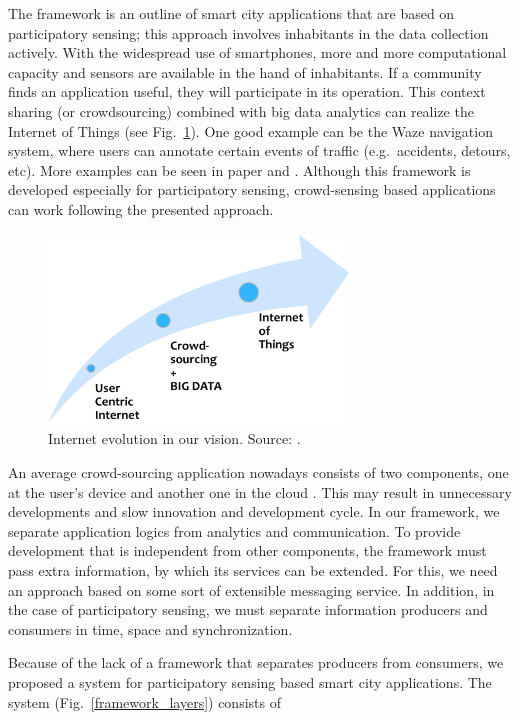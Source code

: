 \documentclass[b5paper,12pt]{report}
\theoremstyle{definition}
\begin{document}
The framework is an outline of smart city applications that are based on participatory sensing; this approach involves inhabitants in the data collection actively. With the widespread use of smartphones, more and more computational capacity and sensors are available in the hand of inhabitants. If a community finds an application useful, they will participate in its operation. This context sharing (or crowdsourcing) combined with big data analytics can realize the Internet of Things (see Fig.~\ref{framework_iot}). One good example can be the Waze navigation system, where users can annotate certain events of traffic (e.g.~accidents, detours, etc). More examples can be seen in paper \cite[chapter III]{szabo2013framework} and \cite{besenczi2013kozossegi}. Although this framework is developed especially for participatory sensing, crowd-sensing based applications can work following the presented approach.

\begin{figure}[ht!]
\centerline{
\includegraphics[width=8cm]{img/framework_iot.png}}
\caption{Internet evolution in our vision. Source: \cite{szabo2013framework}.}
\label{framework_iot}
\end{figure}

An average crowd-sourcing application nowadays consists of two components, one at the user's device and another one in the cloud \cite{ganti2011mobile}. This may result in unnecessary developments and slow innovation and development cycle. In our framework, we separate application logics from analytics and communication. To provide development that is independent from other components, the framework must pass extra information, by which its services can be extended. For this, we need an approach based on some sort of extensible messaging service. In addition, in the case of participatory sensing, we must separate information producers and consumers in time, space and synchronization.

Because of the lack of a framework that separates producers from consumers, we proposed a system for participatory sensing based smart city applications. The system (Fig.~\ref{framework_layers}) consists of
\end{document}
